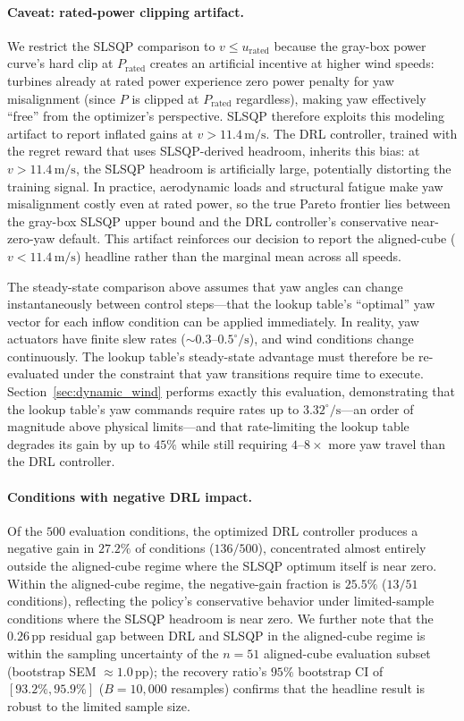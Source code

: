 \documentclass[final,5p,times]{elsarticle}
\begin{document}
\paragraph{Caveat: rated-power clipping artifact.}
We restrict the SLSQP comparison to $v\!\leq\!u_\mathrm{rated}$ because the gray-box power curve's hard clip at $P_\mathrm{rated}$ creates an artificial incentive at higher wind speeds: turbines already at rated power experience zero power penalty for yaw misalignment (since $P$ is clipped at $P_\mathrm{rated}$ regardless), making yaw effectively ``free'' from the optimizer's perspective. SLSQP therefore exploits this modeling artifact to report inflated gains at $v\!>\!11.4\,\mathrm{m/s}$. The DRL controller, trained with the regret reward that uses SLSQP-derived headroom, inherits this bias: at $v\!>\!11.4\,\mathrm{m/s}$, the SLSQP headroom is artificially large, potentially distorting the training signal. In practice, aerodynamic loads and structural fatigue make yaw misalignment costly even at rated power, so the true Pareto frontier lies between the gray-box SLSQP upper bound and the DRL controller's conservative near-zero-yaw default. This artifact reinforces our decision to report the aligned-cube ($v\!<\!11.4\,\mathrm{m/s}$) headline rather than the marginal mean across all speeds.

The steady-state comparison above assumes that yaw angles can change instantaneously between control steps---that the lookup table's ``optimal'' yaw vector for each inflow condition can be applied immediately. In reality, yaw actuators have finite slew rates ($\sim\!0.3$--$0.5^\circ\!/\mathrm{s}$), and wind conditions change continuously. The lookup table's steady-state advantage must therefore be re-evaluated under the constraint that yaw transitions require time to execute. Section~\ref{sec:dynamic_wind} performs exactly this evaluation, demonstrating that the lookup table's yaw commands require rates up to $3.32^\circ\!/\mathrm{s}$---an order of magnitude above physical limits---and that rate-limiting the lookup table degrades its gain by up to $45\%$ while still requiring $4$--$8{\times}$ more yaw travel than the DRL controller.

\paragraph{Conditions with negative DRL impact.}
Of the $500$ evaluation conditions, the optimized DRL controller produces a negative gain in $27.2\%$ of conditions ($136/500$), concentrated almost entirely outside the aligned-cube regime where the SLSQP optimum itself is near zero. Within the aligned-cube regime, the negative-gain fraction is $25.5\%$ ($13/51$ conditions), reflecting the policy's conservative behavior under limited-sample conditions where the SLSQP headroom is near zero. We further note that the $0.26$\,pp residual gap between DRL and SLSQP in the aligned-cube regime is within the sampling uncertainty of the $n{=}51$ aligned-cube evaluation subset (bootstrap SEM $\approx\!1.0$\,pp); the recovery ratio's $95\%$ bootstrap CI of $[93.2\%, 95.9\%]$ ($B{=}10{,}000$ resamples) confirms that the headline result is robust to the limited sample size.
\end{document}
